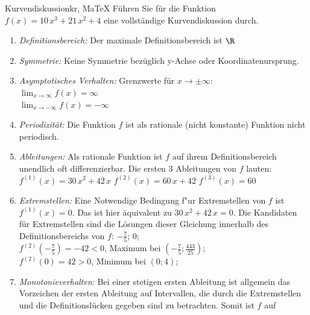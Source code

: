  \providecommand{\MoIl}{(} 
 \providecommand{\MoIr}{)}
 \providecommand{\MIntvlSep}{;} 
 \providecommand{\MElSetSep}{;} 
 \begin{MAufgabe}{Kurvendiskussion}{kr, MaTeX}
 F\"uhren Sie f\"ur die Funktion $f(x)=10\, x^3 + 21\, x^2 + 4$ eine vollst\"andige Kurvendiskussion durch.\\ 
 \ifLsg\Loesung
 \begin{enumerate}
 \item \emph{Definitionsbereich:} 
 Der maximale Definitionsbereich ist $\R$\item \emph{Symmetrie:} 
 Keine Symmetrie bez\"uglich y-Achse oder Koordinatenursprung.\item \emph{Asymptotisches Verhalten:} 
 Grenzwerte f\"ur $x\rightarrow \pm \infty$: \\ 
 $\lim_{x\rightarrow \infty} f(x)=\infty$ \\ 
 $\lim_{x\rightarrow -\infty} f(x)=- \infty$ \\ 
 \item \emph{Periodizit\"at:} 
 Die Funktion $f$ ist als rationale (nicht konstante) Funktion nicht periodisch.\item \emph{Ableitungen:} 
 Als rationale Funktion ist $f$ auf ihrem Definitionsbereich unendlich oft differenzierbar. 
 Die ersten 3 Ableitungen von $f$ lauten: \\ 
 $f^{(1)}(x)=30\, x^2 + 42\, x$\newline 
  $f^{(2)}(x)=60\, x + 42$\newline 
  $f^{(3)}(x)=60$\newline 
  \item \emph{Extremstellen:} 
 Eine Notwendige Bedingung f"ur Extremstellen von $f$ ist $f^{(1)}(x)=0$. 
 Das ist hier \"aquivalent zu $30\, x^2 + 42\, x=0$. 
 Die Kandidaten f\"ur Extremstellen sind die L\"osungen dieser Gleichung innerhalb des Definitionsbereichs von $f$: $- \frac{7}{5}$; $0$; \\ 
 $f^{(2)}(- \frac{7}{5})=-42$$<0$, Maximum bei $(- \frac{7}{5};\frac{443}{25})$; \\ 
 $f^{(2)}(0)=42$$>0$, Minimum bei $(0;4)$; \\ 
 \item \emph{Monotonieverhalten:} 
 Bei einer stetigen ersten Ableitung ist allgemein das Vorzeichen der ersten Ableitung auf Intervallen, die durch die Extremstellen und die Definitionsl\"ucken gegeben sind zu betrachten. Somit ist $f$ auf \\ 

\end{enumerate}
\end{MAufgabe}
